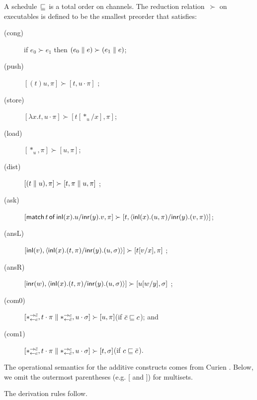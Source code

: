 \newcommand{\red}{\succ}
A schedule~$\sqsubseteq$ is a total order on channels.
The reduction relation~$\red$ on executables
is defined to be the smallest preorder
that satisfies:
\begin{description}
 \item[(cong)] if
      $e_0         \red e_1$
      then
      $(e_0 \conc e) \red (e_1\conc e)$\enspace;
 \item[(push)]
	    $[(t)u,\pi]      \red [t,u\cdot\pi]$      \enspace;
 \item[(store)]
	    $[\lambda x.t,u\cdot\pi]
	     \red
	     [t[\ast_u/x],      \pi]$\enspace;
 \item[(load)]
	    $[\ast_u,\pi]\red [u,\pi]$\enspace;
 \item[(dist)]
           $[(t\conc u),\pi]  \red [t,\pi\conc u,\pi]$ \enspace;
 \item[(ask)]
      $[\mat t x u y v,\pi]\red [t,\mats x u \pi y v \pi]$\enspace;
 \item[(ansL)]
           $[\inl{v}, \mats xt\pi yu\sigma] \red [t[v/x],\pi] $ \enspace;
 \item[(ansR)]
           $[\inr{w}, \mats xt\pi yu\sigma] \red [u[w/y],\sigma] $ \enspace;
 \item[(com0)]
	    $[\comod c{\co c}, t\cdot\pi\conc \comod{\co c}c,
	    u\cdot\sigma] \red
	    [u,\pi]$\enspace(if $\bar{c}\sqsubseteq c$); and
 \item[(com1)]
	    $[\comod c{\co c}, t\cdot\pi\conc \comod{\co c}c,
	    u\cdot\sigma] \red
	    [t,\sigma]$\enspace(if $c\sqsubseteq \bar{c}$).
\end{description}
The operational semantics for the additive constructs comes from Curien .
Below, we omit the outermost parentheses (e.g. [ and ]) for multisets.




The derivation rules follow.\\ \noindent

